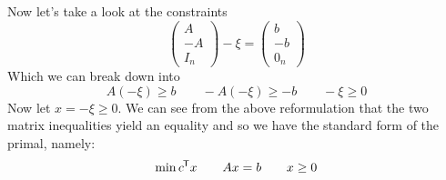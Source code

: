 \documentclass{article}
\newcommand*{\tran}{^{\mkern-1.5mu\mathsf{T}}}%
\begin{document}
	Now let's take a look at  the constraints
	\begin{equation}
		\begin{pmatrix}
		A\\
		-A\\
		I_n
		\end{pmatrix}
		-\xi =  \begin{pmatrix}
		b\\
		-b\\
		0_n 
		\end{pmatrix}
	\end{equation}
	Which we can break down into 
	\begin{equation}
		A(-\xi) \geq  b \qquad -A(-\xi) \geq -b \qquad -\xi \geq 0
	\end{equation}
	Now let $x = -\xi \geq 0$. We can see from the above reformulation that the two matrix inequalities yield an equality and so we have the standard form of the primal, namely:
	\begin{equation}
		\min c\tran x \qquad Ax = b \qquad x \geq 0 
	\end{equation}
	
	
	
	
	
	
	
	
	
	
	
	
	
	
	
	
\end{document}
